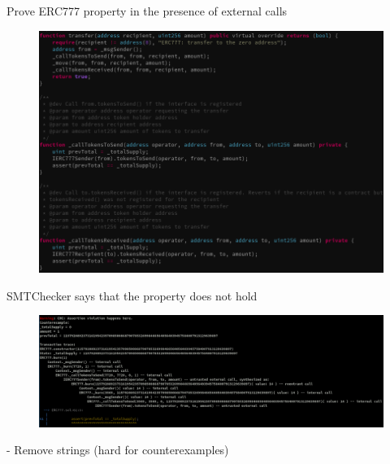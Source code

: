 \documentclass[aspectratio=169,10pt]{beamer}
\begin{document}
\begin{frame}[fragile]
\begin{center}
Prove ERC777 property in the presence of external calls
\begin{figure}
	\includegraphics[scale=0.3]{images/erc777_fail}
\end{figure}
\end{center}
\end{frame}

\begin{frame}[fragile]
\begin{center}
SMTChecker says that the property does not hold
\begin{figure}
	\includegraphics[scale=0.23]{images/erc777_fail_smtchecker_cex}
\end{figure}
- Remove strings (hard for counterexamples)
\end{center}
\end{frame}
\end{document}
